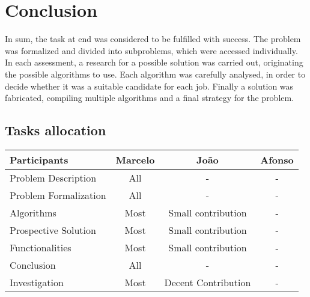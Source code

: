 \chapter{Conclusion}

In sum, the task at end was considered to be fulfilled with success. The problem was formalized and divided into subproblems, which were accessed individually. In each assessment, a research for a possible solution was carried out, originating the possible algorithms to use. Each algorithm was carefully analysed, in order to decide whether it was a suitable candidate for each job. Finally a solution was fabricated, compiling multiple algorithms and a final strategy for the problem.

\section{Tasks allocation}
\begin{center}
    \begin{tabular}{l | c  c  c}
        \textbf{Participants}           & \textbf{Marcelo} & \textbf{João} & \textbf{Afonso} \\ \hline
        Problem Description                   & All & - & -   \\
        Problem Formalization                 & All & - & - \\
        Algorithms                            & Most & Small contribution & -   \\
        Prospective Solution                  & Most & Small contribution & -   \\
        Functionalities                       & Most & Small contribution & -   \\
        Conclusion                            & All & - & -   \\
        Investigation                         & Most & Decent Contribution & - \\
    \end{tabular}
\end{center}
